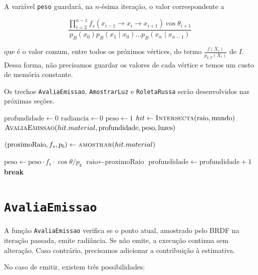 A variável \texttt{peso} guardará, na $n$-ésima iteração, o valor correspondente a 

\[
  \frac{ \prod_{i=2}^{n-1} f_s(x_{i-1} \rightarrow x_{i} \rightarrow x_{i+1})
  \cos \theta_{i+1}}{p_B(x_0)p_B(x_1 \mid x_0) \ldots p_B(x_n \mid x_{n-1})}
\]

que é o valor comum, entre todos os próximos vértices, do termo
$\frac{f(X_i)}{p_{k,T}(X_i)}$ de $I$. Dessa forma, não precisamos guardar os
valores de cada vértice e temos um custo de memória constante.

Os trechos \texttt{AvaliaEmissao}, \texttt{AmostrarLuz} e \texttt{RoletaRussa}
serão desenvolvidos nas próximas seções.

\begin{algorithm}
\caption{Função L}
\begin{algorithmic}[1]
  \State $\text{profundidade} \gets 0$
  \State $\text{radiancia} \gets 0$
  \State $\text{peso} \gets 1$
  \Loop
    \State $hit \gets \Call{Intersecta}{\text{raio}, \text{mundo}}$
      \State $\Call{AvaliaEmissao}{hit.material, \text{profundidade}, \text{peso}, \text{luzes}}$

      \State {}

      \State {}

      \State $(\text{proximoRaio}, f_s, p_b) \gets \Call{amostrar}{hit.material}$

      \State $\text{peso} \gets \text{peso} \cdot f_s \cdot \cos \theta / p_b$
      \State $\text{raio} \gets \text{proximoRaio}$
      \State $\text{profundidade} \gets \text{profundidade} + 1$
    \Else
    \State \textbf{break}
    \EndIf
  \EndLoop
  \EndFunction
\end{algorithmic}
\end{algorithm}

\section{\texttt{AvaliaEmissao}}

A função \texttt{AvaliaEmissao} verifica se o ponto atual, amostrado pelo BRDF na
iteração passada, emite radiância. Se não emite, a execução continua sem
alteração. Caso contrário, precisamos adicionar a contribuição à estimativa.

No caso de emitir, existem três possibilidades:

